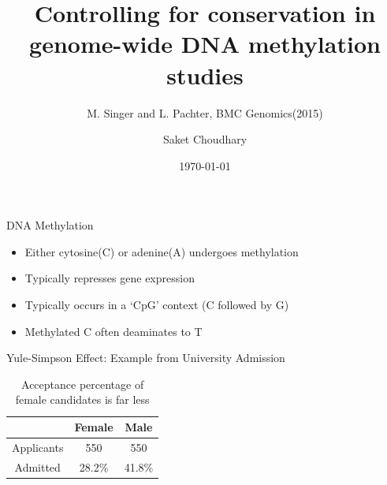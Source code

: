 \documentclass[10pt]{beamer}
\title{ Controlling for conservation in genome-wide DNA methylation studies}
\subtitle{M. Singer and L. Pachter, BMC Genomics(2015)}
\date{\today}
\author{Saket Choudhary}
\begin{document}
\maketitle


\begin{frame}[fragile]{DNA Methylation}
\begin{itemize}
\item Either cytosine(C) or adenine(A) undergoes methylation
\item Typically represses gene expression
\item Typically occurs in a `CpG' context (C followed by G)
\item Methylated C often deaminates to T
\end{itemize}
\end{frame}

\begin{frame}[fragile]{Yule-Simpson Effect: Example from University Admission}
\footnotesize
    \begin{center}
    \begin{table}
    \begin{tabular}{|c|c|c|}
    \hline
    & Female & Male\\
    \hline
    Applicants & 550 & 550 \\
    \hline 
    Admitted & 28.2\% & 41.8\% \\
    \hline
    \end{tabular}
    \caption{Acceptance percentage of female candidates is far less}
    \end{table}
    \end{center}
    \begin{center}
    \end{center}
\end{frame}
\end{document}
